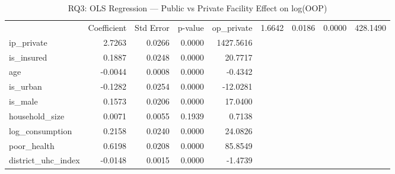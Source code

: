 \begin{table}
\caption{RQ3: OLS Regression — Public vs Private Facility Effect on log(OOP)}
\label{tab:rq3_ols}
\begin{tabular}{lrrrr}
\toprule
 & Coefficient & Std Error & p-value & %
\midrule
op_private & 1.6642 & 0.0186 & 0.0000 & 428.1490 \\
ip_private & 2.7263 & 0.0266 & 0.0000 & 1427.5616 \\
is_insured & 0.1887 & 0.0248 & 0.0000 & 20.7717 \\
age & -0.0044 & 0.0008 & 0.0000 & -0.4342 \\
is_urban & -0.1282 & 0.0254 & 0.0000 & -12.0281 \\
is_male & 0.1573 & 0.0206 & 0.0000 & 17.0400 \\
household_size & 0.0071 & 0.0055 & 0.1939 & 0.7138 \\
log_consumption & 0.2158 & 0.0240 & 0.0000 & 24.0826 \\
poor_health & 0.6198 & 0.0208 & 0.0000 & 85.8549 \\
district_uhc_index & -0.0148 & 0.0015 & 0.0000 & -1.4739 \\
\bottomrule
\end{tabular}
\end{table}
